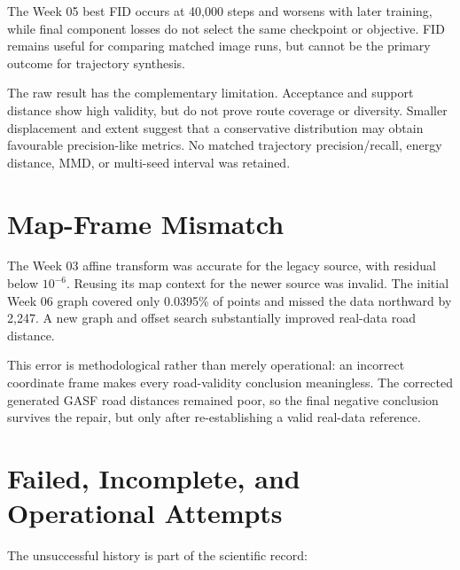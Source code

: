 \documentclass[12pt,a4paper,oneside]{report}
\begin{document}
The Week 05 best FID occurs at 40,000 steps and worsens with later training, while final component losses do not select the same checkpoint or objective. FID remains useful for comparing matched image runs, but cannot be the primary outcome for trajectory synthesis.

The raw result has the complementary limitation. Acceptance and support distance show high validity, but do not prove route coverage or diversity. Smaller displacement and extent suggest that a conservative distribution may obtain favourable precision-like metrics. No matched trajectory precision/recall, energy distance, MMD, or multi-seed interval was retained.

\section{Map-Frame Mismatch}

The Week 03 affine transform was accurate for the legacy source, with residual below $10^{-6}$. Reusing its map context for the newer source was invalid. The initial Week 06 graph covered only 0.0395\% of points and missed the data northward by 2,247. A new graph and offset search substantially improved real-data road distance.

This error is methodological rather than merely operational: an incorrect coordinate frame makes every road-validity conclusion meaningless. The corrected generated GASF road distances remained poor, so the final negative conclusion survives the repair, but only after re-establishing a valid real-data reference.

\section{Failed, Incomplete, and Operational Attempts}

The unsuccessful history is part of the scientific record:
\end{document}
